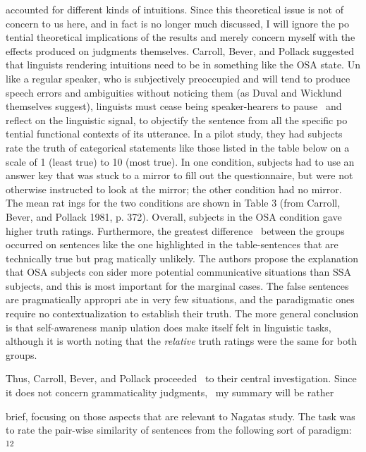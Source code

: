 \begin{styleStandard}
accounted for different kinds of intuitions. Since this theoretical issue is not of concern to us here, and in fact is no longer much discussed, I will ignore the po\- tential theoretical implications of the results and merely concern myself with the effects produced on judgments themselves. Carroll, Bever, and Pollack suggested that linguists rendering intuitions need to be in something like the OSA state. Un\- like a regular speaker, who is subjectively preoccupied and will tend to produce speech errors and ambiguities without noticing them (as Duval and Wicklund themselves suggest), linguists must cease being speaker-hearers to pause \ and reflect on the linguistic signal, to {\textquotedbl}objectify the sentence from all the specific po\- tential functional contexts of its utterance.{\textquotedbl} In a pilot study, they had subjects rate the truth of categorical statements like those listed in the table below on a scale of 1 (least true) to 10 (most true). In one condition, subjects had to use an answer key that was stuck to a mirror to fill out the questionnaire, but were not otherwise instructed to look at the mirror; the other condition had no mirror. The mean rat\- ings for the two conditions are shown in Table 3 (from Carroll, Bever, and Pollack 1981, p. 372). Overall, subjects in the OSA condition gave higher truth ratings. Furthermore, the greatest difference \ between the groups occurred on sentences like the one highlighted in the table-sentences that are technically true but prag\- matically unlikely. The authors propose the explanation that OSA subjects con\- sider more potential communicative situations than SSA subjects, and this is most important for the marginal cases. The false sentences are pragmatically appropri\- ate in very few situations, and the paradigmatic ones require no contextualization to establish their truth. The more general conclusion is that self-awareness manip\- ulation does make itself felt in linguistic tasks, although it is worth noting that the \textit{relative}\textit{ }truth ratings were the same for both groups.
\end{styleStandard}


\begin{styleStandard}
Thus, Carroll, Bever, and Pollack proceeded \ to their central investigation. Since it does not concern grammaticality judgments, \ my summary will be rather
\end{styleStandard}


\clearpage\setcounter{page}{1}\begin{styleStandard}
brief, focusing on those aspects that are relevant to Nagata{\textquotesingle}s study. The task was to rate the pair-wise similarity of sentences from the following sort of paradigm: \textsuperscript{12}
\end{styleStandard}


